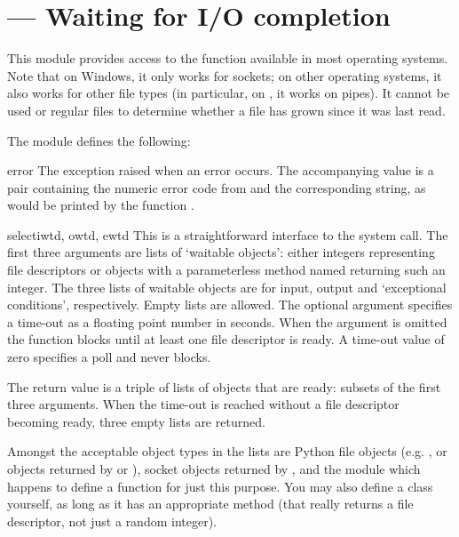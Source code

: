 \section{ ---
         Waiting for I/O completion}



This module provides access to the function 
available in most operating systems.  Note that on Windows, it only
works for sockets; on other operating systems, it also works for other
file types (in particular, on \UNIX{}, it works on pipes).  It cannot
be used or regular files to determine whether a file has grown since
it was last read.

The module defines the following:

\begin{excdesc}{error}
The exception raised when an error occurs.  The accompanying value is
a pair containing the numeric error code from  and the
corresponding string, as would be printed by the \C{} function
.
\end{excdesc}

\begin{funcdesc}{select}{iwtd, owtd, ewtd}
This is a straightforward interface to the \UNIX{} 
system call.  The first three arguments are lists of `waitable
objects': either integers representing \UNIX{} file descriptors or
objects with a parameterless method named  returning
such an integer.  The three lists of waitable objects are for input,
output and `exceptional conditions', respectively.  Empty lists are
allowed.  The optional  argument specifies a time-out as a
floating point number in seconds.  When the  argument
is omitted the function blocks until at least one file descriptor is
ready.  A time-out value of zero specifies a poll and never blocks.

The return value is a triple of lists of objects that are ready:
subsets of the first three arguments.  When the time-out is reached
without a file descriptor becoming ready, three empty lists are
returned.

Amongst the acceptable object types in the lists are Python file
objects (e.g. , or objects returned by
 or ), socket objects
returned by ,%
and the module  which happens to
define a function %
for just this purpose.  You may
also define a  class yourself, as long as it has an
appropriate  method (that really returns a \UNIX{}
file descriptor, not just a random integer).
\end{funcdesc}
